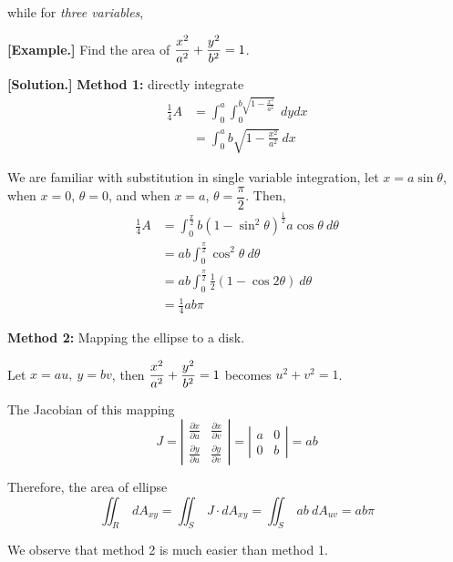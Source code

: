 \documentclass[11pt, a4paper]{MATH2023}
\newcommand{\eg}{\textbf{[Example.] }}
\newcommand{\sol}{\textbf{[Solution.] }}
\begin{document}
\begin{spacing}{1.3}
    while for {\it three variables}, 
    \begin{center}
    \end{center}

    \newpage
    \eg Find the area of $\displaystyle \frac{x^2}{a^2}+\frac{y^2}{b^2}=1$.

    \sol {\bf Method 1:} directly integrate 
    \begin{align*}
        \frac{1}{4}A &= \int_{0}^{a} \int_{0}^{b\sqrt{1-\frac{x^2}{a^2}}}\ dydx\\
         &= \int_0^a b\sqrt{1-\frac{x^2}{a^2}}\ dx
    \end{align*}

    We are familiar with substitution in single variable integration, let $x=a\sin\theta$,
    when $x=0$, $\theta=0$, and when $x=a$, $\theta=\dfrac{\pi}{2}$. Then,
    \begin{align*}
        \frac{1}{4}A &= \int_0^{\frac{\pi}{2}} b(1-\sin^2\theta)^{\frac{1}{2}} a\cos\theta\ d\theta \\ 
        &= ab\int_0^{\frac{\pi}{2}} \cos^2\theta\ d\theta\\
        &= ab\int_0^{\frac{\pi}{2}} \frac{1}{2}(1-\cos2\theta)\ d\theta\\
        &= \frac{1}{4}ab\pi
    \end{align*}

    {\bf Method 2:} Mapping the ellipse to a disk.

    Let $x=au,\ y=bv$, then $\displaystyle \frac{x^2}{a^2}+\frac{y^2}{b^2}=1$ becomes $u^2+v^2=1$.

    The Jacobian of this mapping 
    $$J=\left|\begin{array}{ll}\frac{\partial x}{\partial u} & \frac{\partial x}{\partial v} \\ \frac{\partial y}{\partial u} & \frac{\partial y}{\partial v}\end{array}\right|
    =\left| \begin{array}{cc}
        a & 0 \\ 0 & b
    \end{array} \right|=ab$$

    Therefore, the area of ellipse 
    $$\iint_R\ dA_{xy}=\iint_S\ J\cdot dA_{xy}=\iint_S\ ab\ dA_{uv}=ab\pi$$

    We observe that method 2 is much easier than method 1.


\end{spacing}
\end{document}
